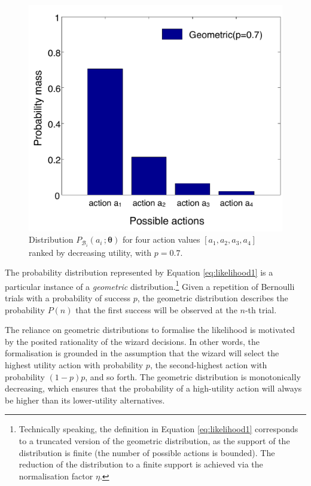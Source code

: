 \begin{figure}
\vspace{-2mm}
\centering
\includegraphics[scale=0.34]{imgs/geometric.pdf} 
\vspace{-6mm}
\caption{Distribution $P_{\mathcal{B}_i}(a_i\,; \boldsymbol\theta)$ for four action values $[a_1, a_2, a_3, a_4]$ ranked by decreasing utility, with $p=0.7$.}
\label{fig:geometric}
\end{figure}
The probability distribution represented by Equation \eqref{eq:likelihood1} is a particular instance of a \textit{geometric} distribution.\footnote{Technically speaking, the definition in Equation \eqref{eq:likelihood1} corresponds to a truncated version of the geometric distribution, as the support of the distribution is finite (the number of possible actions is bounded). The reduction of the distribution to a finite support is achieved via the normalisation factor $\eta$.} Given a repetition of Bernoulli trials with a probability of success $p$, the geometric distribution describes the probability $P(n)$ that the first success will be observed at the $n$-th trial. 

The reliance on geometric distributions to formalise the likelihood is motivated by the posited rationality of the wizard decisions.  In other words, the formalisation is grounded in the assumption that the wizard will select the highest utility action with probability $p$, the second-highest action with probability $(1-p)p$, and so forth. The geometric distribution is monotonically decreasing, which ensures that the probability of a high-utility action will always be higher than its lower-utility alternatives.   

